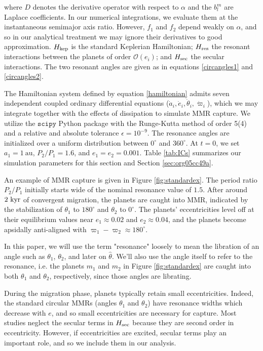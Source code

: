 \documentclass[usenatbib]{mnras}
\renewcommand{\O}{\mathcal{O}}
\begin{document}
\noindent where \(D\) denotes the derivative operator with
respect to \(\alpha\) and the \(b_{l}^m\) are Laplace coefficients.  In
our numerical integrations, we evaluate them at the instantaneous
semimajor axis ratio.  However, \(f_1\) and \(f_2\) depend weakly on
\(\alpha\), and so in our analytical treatment we may ignore their
derivatives to good approximation.  \(H_{\rm kep}\) is the standard
Keplerian Hamiltonian; \(H_{\rm res}\) the resonant interactions between
the planets of order \(\O(e_i)\); and \(H_{\rm sec}\) the secular
interactions.  The two resonant angles are given as in equations
\eqref{circangles1} and \eqref{circangles2}.

The Hamiltonian system defined by equation \eqref{hamiltonian} admits
seven independent coupled ordinary differential equations (\(\dot a_i,
\dot e_i, \dot\theta_i, \dot\varpi_i\)), which we may integrate
together with the effects of dissipation to simulate MMR capture.  We
utilize the \(\mathtt{scipy}\) Python package with the Runge-Kutta
method of order 5(4) and a relative and absolute tolerance
\(\epsilon=10^{-9}\).  The resonance angles are initialized over a
uniform distribution between \(0^\circ\) and \(360^\circ\).  At \(t=0\), we
set \(a_1=1~\mathrm{au}\), \(P_2/P_1=1.6\), and \(e_1=e_2=0.001\).  Table
\ref{tab:ICs} summarizes our simulation parameters for this section and
Section \ref{sec:org05cc49a}.

An example of MMR capture is given in Figure \ref{fig:standardex}.  The
period ratio \(P_2/P_1\) initially starts wide of the nominal resonance
value of \(1.5\).  After around \(2~\rm{kyr}\) of convergent migration,
the planets are caught into MMR, indicated by the stabilization of
\(\theta_1\) to \(180^\circ\) and \(\theta_2\) to \(0^\circ\).  The planets'
eccentricities level off at their equilibrium values near \(e_1\approx
0.02\) and \(e_2\approx0.04\), and the planets become apsidally
anti-aligned with \(\varpi_1-\varpi_2\approx 180^\circ\).

In this paper, we will use the term "resonance" loosely to mean the
libration of an angle such as \(\theta_1\), \(\theta_2\), and later on
\(\hat\theta\).  We'll also use the angle itself to refer to the
resonance, i.e. the planets \(m_1\) and \(m_2\) in Figure
\ref{fig:standardex} are caught into both \(\theta_1\) and \(\theta_2\),
respectively, since those angles are librating.

During the migration phase, planets typically retain small
eccentricities. Indeed, the standard circular MMRs (angles \(\theta_1\)
and \(\theta_2\)) have resonance widths which decrease with \(e\),
and so small eccentricities are necessary for capture.  Most studies
neglect the secular terms in \(H_{\rm sec}\) because they are second
order in eccentricity.  However, if eccentricities are excited,
secular terms play an important role, and so we include them in our
analysis.
\end{document}
